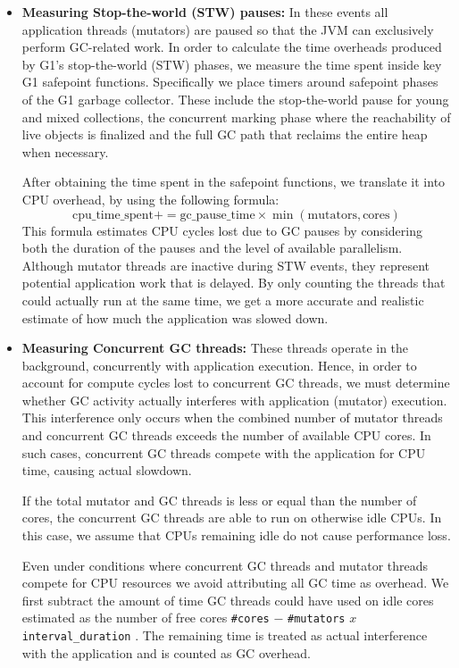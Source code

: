 \begin{itemize}
	\item \textbf{Measuring Stop-the-world (STW) pauses:} In these events
	      all application threads (mutators) are paused so that the JVM can exclusively perform
	      GC-related work. In order to calculate the time overheads produced by G1’s stop-the-world (STW) phases,
	      we measure the time spent inside key G1 safepoint functions.
	      Specifically we place timers around safepoint phases of the G1 garbage collector.
	      These include the stop-the-world pause for young and mixed collections, the concurrent
	      marking phase where the reachability of live objects is finalized and the full GC path
	      that reclaims the entire heap when necessary.

	      After obtaining the time spent in the safepoint functions, we translate it into CPU overhead, by using the following formula:
	      \[
		      \text{cpu\_time\_spent} += \text{gc\_pause\_time} \times \min(\text{mutators}, \text{cores})
	      \]
	      This formula estimates CPU cycles lost due to GC pauses by considering both the duration of the pauses and the level of available parallelism.
	      Although mutator threads are inactive during STW events, they represent potential application work that is delayed.
	      By only counting the threads that could actually run at the same time, we get a more accurate and realistic estimate of how much the application was slowed down.

	\item \textbf{Measuring Concurrent GC threads:} These threads operate in the background,
	      concurrently with application execution.
	      Hence, in order to account for compute cycles lost to concurrent GC threads,
	      we must determine whether GC activity actually interferes with
	      application (mutator) execution. This interference only occurs when the combined number of
	      mutator threads and concurrent GC threads exceeds the number of available
	      CPU cores. In such cases, concurrent GC threads compete with the application
	      for CPU time, causing actual slowdown.

	      If the total mutator and GC threads is less or equal than the number of cores, the concurrent
	      GC threads are able to run on otherwise idle CPUs. In this case, we assume that
	      CPUs remaining idle do not cause performance loss.

	      Even under conditions where concurrent GC threads and mutator threads compete for CPU resources we avoid attributing all GC time as overhead.
	      We first subtract the amount of time GC threads could have used on idle cores estimated
	      as the number of free cores \texttt{\#cores} $-$ \texttt{\#mutators} $x$ \texttt{interval\_duration} .
	      The remaining time is treated as actual interference with the
	      application and is counted as GC overhead.


\end{itemize}
